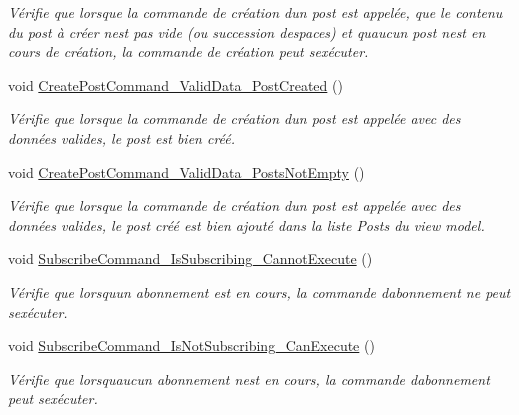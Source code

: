 \begin{DoxyCompactItemize}
\begin{DoxyCompactList}\small\item\em Vérifie que lorsque la commande de création d\textquotesingle{}un post est appelée, que le contenu du post à créer n\textquotesingle{}est pas vide (ou succession d\textquotesingle{}espaces) et qu\textquotesingle{}aucun post n\textquotesingle{}est en cours de création, la commande de création peut s\textquotesingle{}exécuter. \end{DoxyCompactList}\item 
void \hyperlink{class_boxes_1_1_tests_1_1_box_view_model_tests_abca3833cda01ac0726f8651c87d1f5cb}{Create\+Post\+Command\+\_\+\+Valid\+Data\+\_\+\+Post\+Created} ()
\begin{DoxyCompactList}\small\item\em Vérifie que lorsque la commande de création d\textquotesingle{}un post est appelée avec des données valides, le post est bien créé. \end{DoxyCompactList}\item 
void \hyperlink{class_boxes_1_1_tests_1_1_box_view_model_tests_a69b701c72f976a0b9991a68c32ebb1f6}{Create\+Post\+Command\+\_\+\+Valid\+Data\+\_\+\+Posts\+Not\+Empty} ()
\begin{DoxyCompactList}\small\item\em Vérifie que lorsque la commande de création d\textquotesingle{}un post est appelée avec des données valides, le post créé est bien ajouté dans la liste {\ttfamily Posts} du view model. \end{DoxyCompactList}\item 
void \hyperlink{class_boxes_1_1_tests_1_1_box_view_model_tests_a15cda1891327ab478a31afd8ef210945}{Subscribe\+Command\+\_\+\+Is\+Subscribing\+\_\+\+Cannot\+Execute} ()
\begin{DoxyCompactList}\small\item\em Vérifie que lorsqu\textquotesingle{}un abonnement est en cours, la commande d\textquotesingle{}abonnement ne peut s\textquotesingle{}exécuter. \end{DoxyCompactList}\item 
void \hyperlink{class_boxes_1_1_tests_1_1_box_view_model_tests_a8d845723caa18ff42634cbd9c1c22ebd}{Subscribe\+Command\+\_\+\+Is\+Not\+Subscribing\+\_\+\+Can\+Execute} ()
\begin{DoxyCompactList}\small\item\em Vérifie que lorsqu\textquotesingle{}aucun abonnement n\textquotesingle{}est en cours, la commande d\textquotesingle{}abonnement peut s\textquotesingle{}exécuter. \end{DoxyCompactList}\item 

\end{DoxyCompactItemize}
